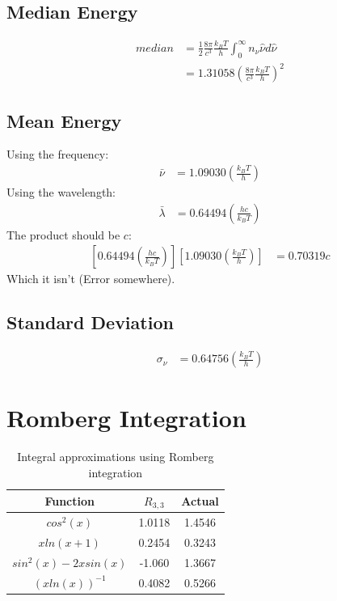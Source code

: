 \documentclass[12pt]{article}
\begin{document}
  \subsection{Median Energy}

  \begin{align}
    median &= \frac{1}{2}\frac{8\pi}{c^3}\frac{k_BT}{h}\int^{\infty}_0 n_{\nu}\hat{\nu}d\hat{\nu}\nonumber\\
      &=  1.31058 \left(\frac{8\pi}{c^3}\frac{k_BT}{h}\right)^2 \nonumber
  \end{align}

  \subsection{Mean Energy}
  
  Using the frequency:
  \begin{align}
    \bar{\nu} &= 1.09030 \left(\frac{k_BT}{h}\right) \nonumber
  \end{align}
  Using the wavelength:
  \begin{align}
    \bar{\lambda} &= 0.64494 \left(\frac{hc}{k_BT}\right) \nonumber
  \end{align}
  The product should be $c$:
  \begin{align}
    \left[0.64494 \left(\frac{hc}{k_BT}\right)\right]\left[1.09030 \left(\frac{k_BT}{h}\right)\right] &= 0.70319c \nonumber
  \end{align}
  Which it isn't (Error somewhere).
  

  \subsection{Standard Deviation}

  \begin{align}
    \sigma_{\nu} &= 0.64756 \left(\frac{k_BT}{h}\right) \nonumber
  \end{align}

  \clearpage

  \section{Romberg Integration}
  
  \begin{table}[h!]
  \centering
  \begin{tabular}{ | c | c | c |}
    \hline
    Function  & $R_{3,3}$ & Actual \\ \hline
    $cos^2(x)$          & 1.0118 & 1.4546 \\
    $xln(x+1)$          & 0.2454 & 0.3243 \\
    $sin^2(x)-2xsin(x)$ & -1.060 & 1.3667 \\ 
    $(xln(x))^{-1}$     & 0.4082 & 0.5266 \\ \hline
  \end{tabular}
  \caption{Integral approximations using Romberg integration}
  \end{table}
\end{document}
